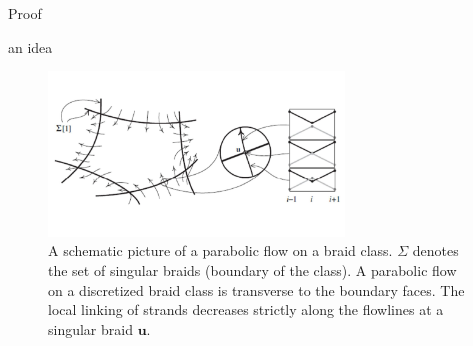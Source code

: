 \documentclass[9pt, english]{beamer}
\theoremstyle{definition}
\newcommand{\simbolovettore}[1]{{\boldsymbol{#1}}}
\newcommand{\vu}{\simbolovettore{u}}
\begin{document}
\begin{frame}{Proof}
    \begin{block}{an idea}
    \begin{figure}\label{fig:idea}
        \includegraphics[width=0.7\textwidth]{images/Fig2Inventiones2.pdf}\caption{A schematic picture of a parabolic flow on
        a braid class. $\Sigma$ denotes the set of singular braids (boundary of the class). A parabolic flow on a discretized
        braid class is transverse to the boundary faces. The local linking of strands decreases strictly along the
        flowlines at a singular braid $\vu$.}
        \end{figure}
    \end{block}
\end{frame}
\end{document}
